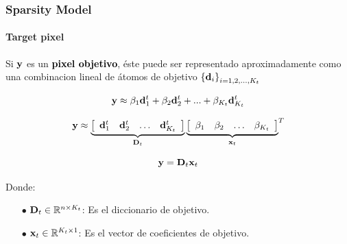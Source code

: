 \documentclass[spanish,xcolor=dvipsnames]{beamer}
\begin{document}
    \begin{frame}
    	\frametitle{Sparsity Model}
    	\framesubtitle{Target pixel}

 Si ${\bf y}$ es un \textcolor{black} {\bf pixel objetivo}, éste puede ser representado aproximadamente como una combinacion lineal de átomos de objetivo ${\{{\bf d}_i\}}_{i=1,2,...,K_t}$  

	\begin{equation}
		\nonumber  {\bf y} \approx {\beta}_1{\bf d}_1^t+{\beta}_2{\bf d}_2^t+...+{\beta}_{K_t}{\bf d}_{K_t}^t
	\end{equation}

	\begin{equation}
		\nonumber  {\bf y} \approx \underbrace{ \left[ \begin{array}{cccc}
 {\bf d}_1^t & {\bf d}_2^t & \ldots & {\bf d}_{K_t}^t \end{array} \right]}_{{\bf D}_t} 
{\underbrace{ \left[ \begin{array}{cccc} {\beta}_1 & {\beta}_2 & \ldots & {\beta}_{K_t} \end{array} \right]}_{{\bf x}_t}}^T
	\end{equation}

	\begin{equation}
		\nonumber  {\bf y} = {\bf D}_t {\bf x}_t
    	\end{equation}

Donde:
	\begin{itemize}	
		\item[\color {black}\bf $\bullet$] ${\bf D}_t \in \mathbb{R}^{n \times {K_t}}$: Es el diccionario de objetivo.\\
		\item[\color {black}\bf $\bullet$] ${\bf x}_t \in \mathbb{R}^{K_t \times 1}$: Es el vector de coeficientes de objetivo.\\
	\end{itemize}

\end{frame}

\end{document}
